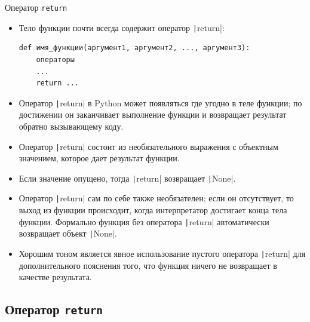 \documentclass[aspectratio=169, mathserif]{beamer}%
\begin{document}
\begin{frame}[fragile]{Оператор \texttt{return}}
\scriptsize
\begin{itemize}
\item Тело функции почти всегда содержит оператор \texttt|return|:
\begin{verbatim}
def имя_функции(аргумент1, аргумент2, ..., аргумент3):
    операторы
    ...
    return ...
\end{verbatim}
\item Оператор \texttt|return| в Python может появляться где угодно в теле функции; по достижении он заканчивает выполнение функции и возвращает результат обратно вызывающему коду. 
\item Оператор \texttt|return| состоит из необязательного выражения с объектным значением, которое дает результат функции. 
\item Если значение опущено, тогда \texttt|return| возвращает \texttt|None|. 
\item Оператор \texttt|return| сам по себе также необязателен; если он отсутствует, то выход из функции происходит, когда  интерпретатор достигает конца тела функции. Формально функция без оператора \texttt|return| автоматически возвращает объект \texttt|None|. 
\item Хорошим тоном является явное использование пустого оператора \texttt|return| для дополнительного пояснения того, что функция ничего не возвращает в качестве результата.
\end{itemize}
\vfill
\end{frame}

\subsection{Оператор \texttt{return}}
\end{document}
